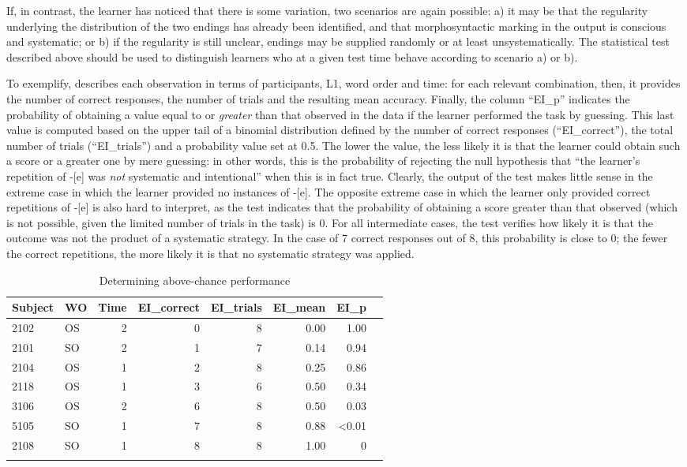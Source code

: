If, in contrast, the learner has noticed that there is some variation, two scenarios are again possible:  a) it may be that the regularity underlying the distribution of the two endings has already been identified, and that morphosyntactic marking in the output is conscious and systematic; or b) if the regularity is still unclear, endings may be supplied randomly or at least unsystematically. The statistical test described above should be used to distinguish learners who at a given test time behave according to scenario a) or b). 

To exemplify,  describes each observation in terms of participants, L1, word order and time: for each relevant combination, then, it provides the number of correct responses, the number of trials and the resulting mean accuracy. Finally, the column “EI\_p” indicates the probability of obtaining a value equal to or \textit{greater} than that observed in the data if the learner performed the task by guessing. This last value is computed based on the upper tail of a binomial distribution defined by the number of correct responses (“EI\_correct”), the total number of trials (“EI\_trials”) and a probability value set at 0.5. The lower the value, the less likely it is that the learner could obtain such a score or a greater one by mere guessing: in other words, this is the probability of rejecting the null hypothesis that “the learner’s repetition of -[e] was \textit{not} systematic and intentional” when this is in fact true. Clearly, the output of the test makes little sense in the extreme case in which the learner provided no instances of -[e]. The opposite extreme case in which the learner only provided correct repetitions of -[e] is also hard to interpret, as the test indicates that the probability of obtaining a score greater than that observed (which is not possible, given the limited number of trials in the task) is 0. For all intermediate cases, the test verifies how likely it is that the outcome was not the product of a systematic strategy. In the case of 7 correct responses out of 8, this probability is close to 0; the fewer the correct repetitions, the more likely it is that no systematic strategy was applied.

\begin{table}
    \begin{tabularx}{\textwidth}{XXrrrrrr}
    \lsptoprule
     Subject & WO & Time & EI\_correct & EI\_trials & EI\_mean & EI\_p\\
     \midrule
     2102 & OS & 2 & 0 & 8 & 0.00 & 1.00\\
     2101 & SO & 2 & 1 & 7 & 0.14 & 0.94\\
     2104 & OS & 1 & 2 & 8 & 0.25 & 0.86\\
     2118 & OS & 1 & 3 & 6 & 0.50 & 0.34\\
     3106 & OS & 2 & 6 & 8 & 0.50 & 0.03\\
     5105 & SO & 1 & 7 & 8 & 0.88 & <0.01\\
     2108 & SO & 1 & 8 & 8 & 1.00 & 0\\
    \lspbottomrule
    \end{tabularx}
    \caption{Determining above-chance performance}
    \label{tab:04:6}
\end{table}

